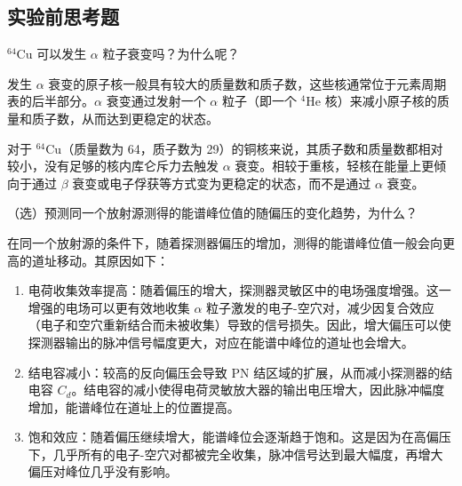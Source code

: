 \documentclass[dvipsnames, svgnames,a4paper,11pt]{article}
\begin{document}
	


	




\subsection{实验前思考题}

\begin{question}
	$^{64}\mathrm{Cu}$ 可以发生 $\alpha$ 粒子衰变吗？为什么呢？
\end{question}

	发生 $\alpha$ 衰变的原子核一般具有较大的质量数和质子数，这些核通常位于元素周期表的后半部分。$\alpha$ 衰变通过发射一个 $\alpha$ 粒子（即一个 $^4\mathrm{He}$ 核）来减小原子核的质量和质子数，从而达到更稳定的状态。

	对于 $^{64}\mathrm{Cu}$（质量数为 64，质子数为 29）的铜核来说，其质子数和质量数都相对较小，没有足够的核内库仑斥力去触发 $\alpha$ 衰变。相较于重核，轻核在能量上更倾向于通过 $\beta$ 衰变或电子俘获等方式变为更稳定的状态，而不是通过 $\alpha$ 衰变。






\begin{question}
	（选）预测同一个放射源测得的能谱峰位值的随偏压的变化趋势，为什么？
\end{question}


	在同一个放射源的条件下，随着探测器偏压的增加，测得的能谱峰位值一般会向更高的道址移动。其原因如下：
	
	\begin{enumerate}
		\item 电荷收集效率提高：随着偏压的增大，探测器灵敏区中的电场强度增强。这一增强的电场可以更有效地收集 $\alpha$ 粒子激发的电子-空穴对，减少因复合效应（电子和空穴重新结合而未被收集）导致的信号损失。因此，增大偏压可以使探测器输出的脉冲信号幅度更大，对应在能谱中峰位的道址也会增大。
		\item 结电容减小：较高的反向偏压会导致 PN 结区域的扩展，从而减小探测器的结电容 $C_d$。结电容的减小使得电荷灵敏放大器的输出电压增大，因此脉冲幅度增加，能谱峰位在道址上的位置提高。
		\item 饱和效应：随着偏压继续增大，能谱峰位会逐渐趋于饱和。这是因为在高偏压下，几乎所有的电子-空穴对都被完全收集，脉冲信号达到最大幅度，再增大偏压对峰位几乎没有影响。
	\end{enumerate}
	
\end{document}
